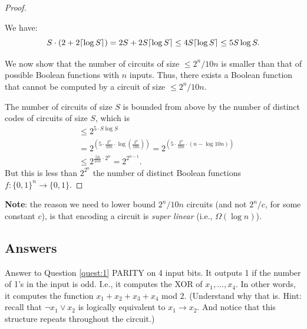 \begin{proof}
\begin{proofclaim}
We have:
$$
S \cdot(2+2 \lceil \log S \rceil) = 
2S +2S \lceil \log S \rceil \leq  4 S {\lceil{\log S}\rceil}\le 5S\log S.$$
\end{proofclaim}

We now show that the number of circuits of size $\leq 2^n / 10 n$ is smaller than that of possible Boolean functions with $n$ inputs.
Thus,  there exists a Boolean function that cannot be computed by a circuit of size $\leq 2^n / 10 n$.

The number of circuits of size $S$ is bounded from above by the number of distinct codes of circuits of size $S$, which is
$$
\begin{aligned}
& \leq 2^{5 \cdot S \log S} \\
& =2^{\left(5 \cdot \frac{2^{n}}{10n} \cdot \log \left(\frac{2^n}{10n}\right)\right)}=
2^{\left(5 \cdot \frac{2^n}{10 n} \cdot(n-\log 10 n)\right)} \\
& \leq 2^{\frac{5 n}{10 n} \cdot 2^n}=2^{2^{n-1}} . 
\end{aligned}
$$
But this is 
less than $2^{2^n}$ the number of distinct Boolean functions $f:\{0,1\}^n\to\{0,1\}$. 
\end{proof}

\noindent \textbf{Note}:  the reason we need to lower bound $2^n/10n$ circuits (and not $2^n/c$, for some constant $c$), is that encoding a circuit is \emph{super linear} (i.e., $\Omega (\log n)$).



\subsection{Answers}








\begin{trailer}{Answer to Question \ref{quest:1}}\label{trailer:xor-circuit}
     PARITY on 4 input bits. It outputs 1 if the number of 1's in the input is odd. I.e., it computes the XOR of $x_1, \ldots, x_4$. In other words, it computes the function $x_1+x_2+x_3+x_4$ mod 2. (Understand why that is. Hint: recall that ${\neg x_1}\lor x_2$ is logically equivalent to $x_1\to x_2$. And notice that this structure repeats throughout the circuit.)
\end{trailer}



